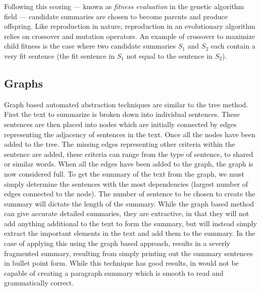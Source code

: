 Following this scoring --- known as {\em fitness evaluation} in the genetic algorithm field --- candidate summaries are chosen to become parents and produce offspring. Like reproduction in nature, reproduction in an evolutionary algorithm relies on crossover and mutation operators. An example of crossover to maximize child fitness is the case where two candidate summaries $S_1$ and $S_2$ each contain a very fit sentence (the fit sentence in $S_1$ not equal to the sentence in $S_2$).


\subsection{Graphs}
Graph based automated abstraction techniques are similar to the tree method. First the text to summarize is broken down into individual sentences. These sentences are then placed into nodes which are initially connected by edges representing the adjacency of sentences in the text. Once all the nodes have been added to the tree. The missing edges representing other criteria within the sentence are added, these criteria can range from the type of sentence, to shared or similar words. When all the edges have been added to the graph, the graph is now considered full. To get the summary of the text from the graph, we must simply determine the sentences with the most dependencies (largest number of edges connected to the node). The number of sentence to be chosen to create the summary will dictate the length of the summary. While the graph based method can give accurate detailed summaries, they are extractive, in that they will not add anything additional to the text to form the summary, but will instead simply extract the important elements in the text and add them to the summary. In the case of applying this using the graph based approach, results in a severly fragmented summary, resulting from simply printing out the summary sentences in bullet point form. While this technique has good results, in would not be capable of creating a paragraph summary which is smooth to read and grammatically correct.